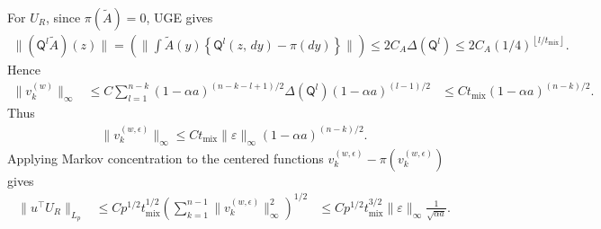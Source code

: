 For \(U_R\), since \(\pi(\widetilde{A}) = 0\), UGE gives
\begin{equation}
\begin{aligned}
\lVert (\mathsf{Q}^l \widetilde{A})(z) \rVert
  = \left(\lVert  \int \widetilde{A}(y) \left\{\mathsf{Q}^l (z, \, d y) - \pi(d y)\right\}  \rVert\right)
  \le 2 C_A \Delta(\mathsf{Q}^l)
  \le 2 C_A (1 / 4)^{\left\lfloor l / t_{\text{mix}} \right\rfloor}.
\end{aligned}
\end{equation}
Hence
\begin{equation}
\begin{aligned}
\lVert v_k^{(w)} \rVert_\infty
&\le C \sum_{l=1}^{n-k}
    (1 - \alpha a)^{(n-k-l+1) / 2}
    \Delta(\mathsf{Q}^l)
    (1 - \alpha a)^{(l-1) / 2} 
&\le C t_{\text{mix}} (1 - \alpha a)^{(n-k) / 2}.
\end{aligned}
\end{equation}
Thus
\begin{equation}
\begin{aligned}
\lVert v_k^{(w, \epsilon)} \rVert_\infty
  \le C t_{\text{mix}} \lVert \varepsilon \rVert_\infty
      (1 - \alpha a)^{(n-k) / 2}.
\end{aligned}
\end{equation}
Applying Markov concentration to the centered functions
\(v_k^{(w, \epsilon)} - \pi(v_k^{(w, \epsilon)})\) gives
\begin{equation}
\begin{aligned}
\lVert u^\top U_R \rVert_{L_p}
&\le C p^{1 / 2} t_{\text{mix}}^{1 / 2}
    \left(\sum_{k=1}^{n-1} \lVert v_k^{(w, \epsilon)} \rVert_\infty^2\right)^{1 / 2}
&\le C p^{1 / 2} t_{\text{mix}}^{3 / 2}
    \lVert \varepsilon \rVert_\infty \frac{1}{\sqrt{\alpha a}}.
\end{aligned}
\end{equation}

